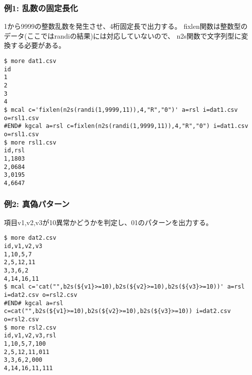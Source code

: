 \subsubsection*{例1: 乱数の固定長化}

1から9999の整数乱数を発生させ、4桁固定長で出力する。
fixlen関数は整数型のデータ(ここではrandiの結果)には対応していないので、
n2s関数で文字列型に変換する必要がある。


\begin{Verbatim}[baselinestretch=0.7,frame=single]
$ more dat1.csv
id
1
2
3
4
$ mcal c='fixlen(n2s(randi(1,9999,11)),4,"R","0")' a=rsl i=dat1.csv o=rsl1.csv
#END# kgcal a=rsl c=fixlen(n2s(randi(1,9999,11)),4,"R","0") i=dat1.csv o=rsl1.csv
$ more rsl1.csv
id,rsl
1,1803
2,0684
3,0195
4,6647
\end{Verbatim}
\subsubsection*{例2: 真偽パターン}

項目v1,v2,v3が10異常かどうかを判定し、01のパターンを出力する。


\begin{Verbatim}[baselinestretch=0.7,frame=single]
$ more dat2.csv
id,v1,v2,v3
1,10,5,7
2,5,12,11
3,3,6,2
4,14,16,11
$ mcal c='cat("",b2s(${v1}>=10),b2s(${v2}>=10),b2s(${v3}>=10))' a=rsl i=dat2.csv o=rsl2.csv
#END# kgcal a=rsl c=cat("",b2s(${v1}>=10),b2s(${v2}>=10),b2s(${v3}>=10)) i=dat2.csv o=rsl2.csv
$ more rsl2.csv
id,v1,v2,v3,rsl
1,10,5,7,100
2,5,12,11,011
3,3,6,2,000
4,14,16,11,111
\end{Verbatim}
